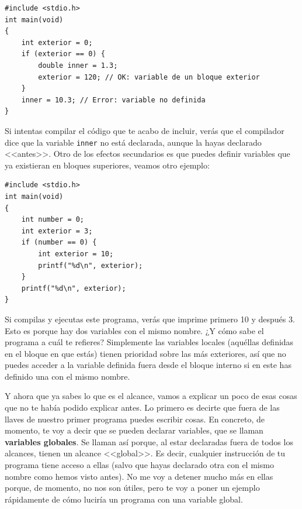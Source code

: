 \documentclass[a4paper]{article}
\begin{document}
\noindent
\begin{minipage}[H]{\linewidth}
\mbox{}
\begin{lstlisting}[style=C,
caption={Ejemplo de alcance de variables declaradas},
label={lst:scopeVar}]
#include <stdio.h>
int main(void)
{
    int exterior = 0;
    if (exterior == 0) {
        double inner = 1.3;
        exterior = 120; // OK: variable de un bloque exterior
    }
    inner = 10.3; // Error: variable no definida
}
\end{lstlisting}
\end{minipage}


Si intentas compilar el código que te acabo de incluir, verás que el compilador
dice que la variable \texttt{inner} no está declarada, aunque la hayas
declarado <<antes>>. Otro de los efectos secundarios es que puedes definir
variables que ya existieran en bloques superiores, veamos otro ejemplo:


\noindent
\begin{minipage}[H]{\linewidth}
\mbox{}
\begin{lstlisting}[style=C,
caption={Ejemplo de redifinición de variable},
label={lst:varRedefinition}]
#include <stdio.h>
int main(void)
{
    int number = 0;
    int exterior = 3;
    if (number == 0) {
        int exterior = 10;
        printf("%d\n", exterior);
    }
    printf("%d\n", exterior);
}
\end{lstlisting}
\end{minipage}


Si compilas y ejecutas este programa, verás que imprime primero 10 y después
3. Esto es porque hay dos variables con el mismo nombre. ¿Y cómo sabe el
programa a cuál te refieres? Simplemente las variables locales (aquéllas
definidas en el bloque en que estás) tienen prioridad sobre las más exteriores,
así que no puedes acceder a la variable definida fuera desde el bloque
interno si en este has definido una con el mismo nombre.

Y ahora que ya sabes lo que es el alcance, vamos a explicar un poco de esas
cosas que no te había podido explicar antes. Lo primero es decirte que fuera
de las llaves de nuestro primer programa puedes escribir cosas. En concreto,
de momento, te voy a decir que se pueden declarar variables, que se llaman
\textbf{variables globales}. Se llaman así porque, al estar declaradas fuera
de todos los alcances, tienen un alcance <<global>>. Es decir, cualquier
instrucción de tu programa tiene acceso a ellas (salvo que hayas declarado
otra con el mismo nombre como hemos visto antes). No me voy a detener mucho
más en ellas porque, de momento, no nos son útiles, pero te voy a poner un
ejemplo rápidamente de cómo luciría un programa con una variable global.
\end{document}
